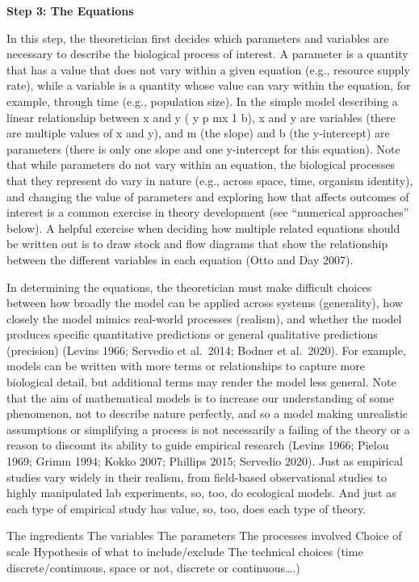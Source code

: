 \documentclass[
]{book}
\theoremstyle{definition}
\theoremstyle{definition}
\theoremstyle{definition}
\theoremstyle{definition}
\theoremstyle{remark}
\begin{document}
\textbf{Step 3: The Equations}

In this step, the theoretician first decides which parameters and variables are necessary to describe the biological process of interest. A parameter is a quantity that has a value that does not vary within a given equation (e.g., resource supply rate), while a variable is a quantity whose value can vary within the equation, for example, through time (e.g., population size). In the simple model describing a linear relationship between x and y ( y p mx 1 b), x and y are variables (there are multiple values of x and y), and m (the slope) and b (the y-intercept) are parameters (there is only one slope and one y-intercept for this equation). Note that while parameters do not vary within an equation, the biological processes that they represent do vary in nature (e.g., across space, time, organism identity), and changing the value of parameters and exploring how that affects outcomes of interest is a common exercise in theory development (see ``numerical approaches'' below). A helpful exercise when deciding how multiple related equations should be written out is to draw stock and flow diagrams that show the relationship between the different variables in each equation (Otto and Day 2007).

In determining the equations, the theoretician must make difficult choices between how broadly the model can be applied across systems (generality), how closely the model mimics real-world processes (realism), and whether the model produces specific quantitative predictions or general qualitative predictions (precision) (Levins 1966; Servedio et al.~2014; Bodner et al.~2020). For example, models can be written with more terms or relationships to capture more biological detail, but additional terms may render the model less general. Note that the aim of mathematical models is to increase our understanding of some phenomenon, not to describe nature perfectly, and so a model making unrealistic assumptions or simplifying a process is not necessarily a failing of the theory or a reason to discount its ability to guide empirical research (Levins 1966; Pielou 1969; Grimm 1994; Kokko 2007; Phillips 2015; Servedio 2020). Just as empirical studies vary widely in their realism, from field-based observational studies to highly manipulated lab experiments, so, too, do ecological models. And just as each type of empirical study has value, so, too, does each type of theory.

The ingredients
The variables
The parameters
The processes involved
Choice of scale
Hypothesis of what to include/exclude
The technical choices (time discrete/continuous, space or not, discrete or continuous\ldots.)
\end{document}
